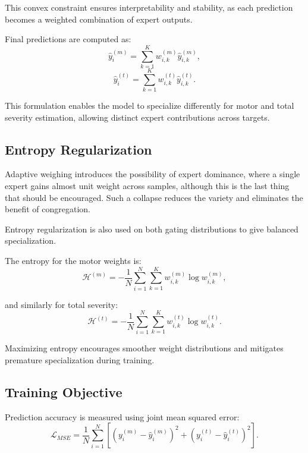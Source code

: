 \documentclass{customIEEEsingle}
\begin{document}
	This convex constraint ensures interpretability and stability, as each prediction becomes a weighted combination of expert outputs.
	
	Final predictions are computed as:
	\begin{equation}
		\hat{y}_i^{(m)} = \sum_{k=1}^{K} w_{i,k}^{(m)} \hat{y}_{i,k}^{(m)},
	\end{equation}
	\begin{equation}
		\hat{y}_i^{(t)} = \sum_{k=1}^{K} w_{i,k}^{(t)} \hat{y}_{i,k}^{(t)}.
	\end{equation}
	
	This formulation enables the model to specialize differently for motor and total severity estimation, allowing distinct expert contributions across targets.
	
	
	\subsection{Entropy Regularization}
	
	Adaptive weighing introduces the possibility of expert dominance, where a single expert gains almost unit weight across samples, although this is the last thing that should be encouraged. Such a collapse reduces the variety and eliminates the benefit of congregation.
	
	Entropy regularization is also used on both gating distributions to give balanced specialization.
	
	The entropy for the motor weights is:
	\begin{equation}
		\mathcal{H}^{(m)} = - \frac{1}{N} 
		\sum_{i=1}^{N} \sum_{k=1}^{K} 
		w_{i,k}^{(m)} \log w_{i,k}^{(m)},
	\end{equation}
	
	and similarly for total severity:
	\begin{equation}
		\mathcal{H}^{(t)} = - \frac{1}{N} 
		\sum_{i=1}^{N} \sum_{k=1}^{K} 
		w_{i,k}^{(t)} \log w_{i,k}^{(t)}.
	\end{equation}
	
	Maximizing entropy encourages smoother weight distributions and mitigates premature specialization during training.
		
	\subsection{Training Objective}
	
	Prediction accuracy is measured using joint mean squared error:
	\begin{equation}
		\mathcal{L}_{MSE} = \frac{1}{N} 
		\sum_{i=1}^{N}
		\left[
		(y_i^{(m)} - \hat{y}_i^{(m)})^2 +
		(y_i^{(t)} - \hat{y}_i^{(t)})^2
		\right].
	\end{equation}
	
\end{document}
